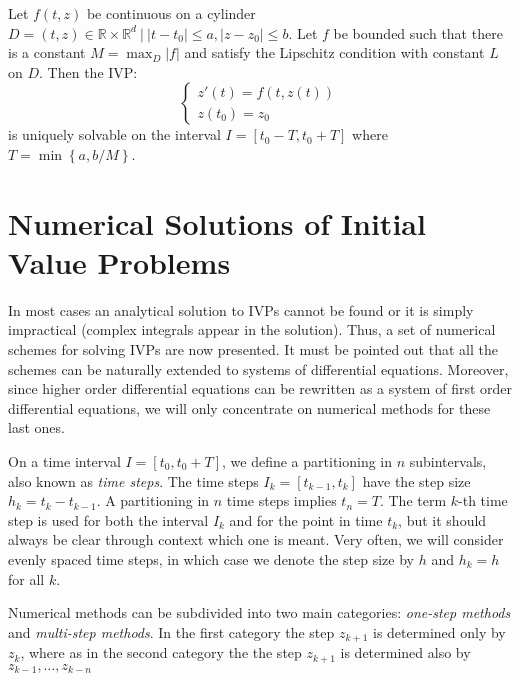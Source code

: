 \begin{theorem}
	Let $f(t,z)$ be continuous on a cylinder $D = {(t,z) \in \mathbb{R} \times \mathbb{R}^d ~ \big| ~ |t-t_0| \leq a, |z-z_0| \leq b}$. Let $f$ be bounded such that there is a constant $M = \max_{D} |f|$ and satisfy the Lipschitz condition with constant $L$ on $D$. Then the IVP:
	\begin{equation}
	\begin{cases}
		z'(t) = f(t,z(t)) \\
		z(t_0) = z_0
	\end{cases}
	\end{equation}
	is uniquely solvable on the interval $I = [t_0-T, t_0+T]$ where $T = \min\left\lbrace a, b/M \right\rbrace$.
\end{theorem}

\section{Numerical Solutions of Initial Value Problems}

In most cases an analytical solution to IVPs cannot be found or it is simply impractical (complex integrals appear in the solution). Thus, a set of numerical schemes for solving IVPs are now presented. It must be pointed out that all the schemes can be naturally extended to systems of differential equations. Moreover, since higher order differential equations can be rewritten as a system of first order differential equations, we will only concentrate on numerical methods for these last ones.

\begin{definition}
On a time interval $I = [t_0,t_0+T]$, we define a partitioning in $n$ subintervals, also known as \textit{time steps}. The time steps $I_k=[t_{k-1}, t_k]$ have the step size $h_k = t_k - t_{k-1}$. A partitioning in $n$ time steps implies $t_n = T$. The term $k$-th time step is used for both the interval $I_k$ and for the point in time $t_k$, but it should always be clear through context which one is meant. Very often, we will consider evenly spaced time steps, in which case we denote the step size by $h$ and $h_k = h$ for all $k$.
\end{definition}

Numerical methods can be subdivided into two main categories: \textit{one-step methods} and \textit{multi-step methods}. In the first category the step $z_{k+1}$ is determined only by $z_{k}$, where as in the second category the the step $z_{k+1}$ is determined also by $z_{k-1},\dots,z_{k-n}$

